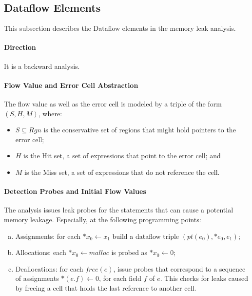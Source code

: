 \subsection{Dataflow Elements}
\label{ss:dataflow}

This subsection describes the Dataflow elements in the memory leak analysis. 

\paragraph{Direction}

It is a backward analysis.

\paragraph{Flow Value and Error Cell Abstraction}

The flow value as well as the error cell is modeled by a triple of the form 
$(S,H,M)$, where:

\begin{itemize}
  \item $S\subseteq Rgn$ is the conservative set of regions that might hold 
    pointers to the error cell;
  \item $H$ is the Hit set, a set of expressions that point to the error cell; and 
  \item $M$ is the Miss set, a set of expressions that do not reference the cell.
\end{itemize}

\paragraph{Detection Probes and Initial Flow Values}

The analysis issues leak probes for the statements that can cause a potential 
memory leakage. Especially, at the following programming points:

\begin{enumerate}[(a)]
  \item Assignments: for each $*x_0\gets x_1$ build a dataflow triple 
    $(pt(e_0),{*e_0},{e_1})$;
  \item Allocations: each $*x_0\gets malloc$ is probed as $*x_0\gets 0$;
  \item Deallocations: for each $free(e)$, issue probes that correspond to a 
    sequence of assignments $*(e.f)\gets 0$, for each field $f$ of $e$. This 
    checks for leaks caused by freeing a cell that holds the last reference 
    to another cell.
\end{enumerate}


